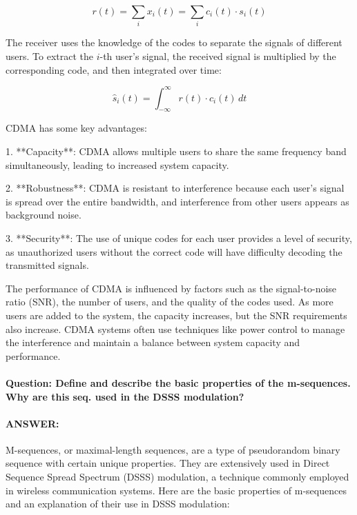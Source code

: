 \documentclass[colorlinks,11pt,a4paper,normalphoto,withhyper,ragged2e]{altareport}
\begin{document}
				\[r(t) = \sum_{i} x_i(t) = \sum_{i} c_i(t) \cdot s_i(t)\]
				
				The receiver uses the knowledge of the codes to separate the signals of different users. To extract the \(i\)-th user's signal, the received signal is multiplied by the corresponding code, and then integrated over time:
				
				\[\hat{s}_i(t) = \int_{-\infty}^{\infty} r(t) \cdot c_i(t) \, dt\]
				
				CDMA has some key advantages:
				
				1. **Capacity**: CDMA allows multiple users to share the same frequency band simultaneously, leading to increased system capacity.
				
				2. **Robustness**: CDMA is resistant to interference because each user's signal is spread over the entire bandwidth, and interference from other users appears as background noise.
				
				3. **Security**: The use of unique codes for each user provides a level of security, as unauthorized users without the correct code will have difficulty decoding the transmitted signals.
				
				The performance of CDMA is influenced by factors such as the signal-to-noise ratio (SNR), the number of users, and the quality of the codes used. As more users are added to the system, the capacity increases, but the SNR requirements also increase. CDMA systems often use techniques like power control to manage the interference and maintain a balance between system capacity and performance.
				
				
				
				
				
				\paragraph{Question: Define and describe the basic properties of the m-sequences. Why are this seq. used in the DSSS modulation?}
				\paragraph{ANSWER:}
				
				M-sequences, or maximal-length sequences, are a type of pseudorandom binary sequence with certain unique properties. They are extensively used in Direct Sequence Spread Spectrum (DSSS) modulation, a technique commonly employed in wireless communication systems. Here are the basic properties of m-sequences and an explanation of their use in DSSS modulation:
				
\end{document}
